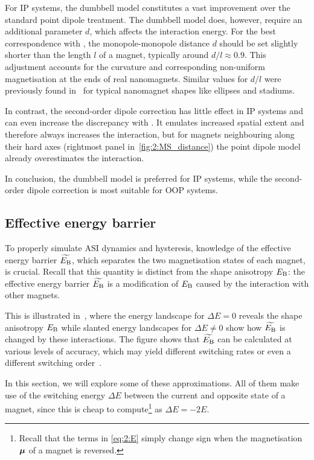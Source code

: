 For IP systems, the dumbbell model constitutes a vast improvement over the standard point dipole treatment.
The dumbbell model does, however, require an additional parameter $d$, which affects the interaction energy.
For the best correspondence with \mumax, the monopole-monopole distance $d$ should be set slightly shorter than the length $l$ of a magnet, typically around $d/l\approx0.9$.
This adjustment accounts for the curvature and corresponding non-uniform magnetisation at the ends of real nanomagnets.
Similar values for $d/l$ were previously found in~ for typical nanomagnet shapes like ellipses and stadiums. \par
In contrast, the second-order dipole correction has little effect in IP systems and can even increase the discrepancy with \mumax. It emulates increased spatial extent and therefore always increases the interaction, but for magnets neighbouring along their hard axes (rightmost panel in~\cref{fig:2:MS_distance}) the point dipole model already overestimates the interaction. \par
In conclusion, the dumbbell model is preferred for IP systems, while the second-order dipole correction is most suitable for OOP systems.

\subsection{Effective energy barrier}\label{sec:2:E_B_eff}
To properly simulate ASI dynamics and hysteresis, knowledge of the effective energy barrier $\widetilde{E_\mathrm{B}}$, which separates the two magnetisation states of each magnet, is crucial.
Recall that this quantity is distinct from the shape anisotropy $E_\mathrm{B}$: the effective energy barrier $\widetilde{E_\mathrm{B}}$ is a modification of $E_\mathrm{B}$ caused by the interaction with other magnets. \par
This is illustrated in~, where the energy landscape for $\Delta E = 0$ reveals the shape anisotropy $E_\mathrm{B}$ while slanted energy landscapes for $\Delta E \neq 0$ show how $\widetilde{E_\mathrm{B}}$ is changed by these interactions.
The figure shows that $\widetilde{E_\mathrm{B}}$ can be calculated at various levels of accuracy, which may yield different switching rates or even a different switching order~\cite{leo2021chiral}. \par
In this section, we will explore some of these approximations.
All of them make use of the switching energy $\Delta E$ between the current and opposite state of a magnet, since this is cheap to compute\footnote{
	Recall that the terms in \cref{eq:2:E} simply change sign when the magnetisation $\boldsymbol{\mathbf{\mu}}$ of a magnet is reversed.
} as $\Delta E = -2 E$.

